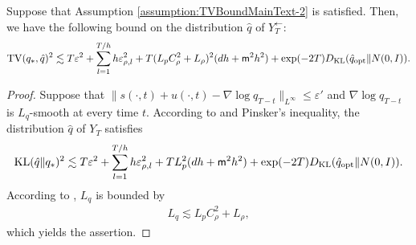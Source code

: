 \begin{thm}\label{thm:Diffusion-1-appendix}
Suppose that Assumption \ref{assumption:TVBoundMainText-2} is satisfied. Then, we have the following bound on the distribution $\hat{q}$ of $Y^\leftarrow_T$: 
\begin{align}
\mathrm{TV}(q_*,\hat{q})^2
\lesssim  T \varepsilon^2 + \sum_{l=1}^{T/h} h \varepsilon_{\rho,l}^2 + T (L_pC_\rho^2+L_\rho)^2(dh + \mathsf{m}^2 h^2 )+ \exp(-2 T)D_{\mathrm{KL}}(\hat{q}_{\mathrm{opt}} \| N(0,I)).
\end{align}
\end{thm}
\begin{proof}
    Suppose that $\|s(\cdot,t)+u(\cdot,t)-\nabla \log q_{T-t}\|_{L^\infty}\leq \varepsilon'$ and $\nabla \log q_{T-t}$ is $L_q$-smooth at every time $t$. 
    According to \cite{chen2023sampling} and Pinsker's inequality, the distribution $\hat{q}$ of $Y_T$ satisfies
    \begin{align}
        \mathrm{KL}(\hat{q}\|q_*)^2 \lesssim
       T \varepsilon^2 + \sum_{l=1}^{T/h} h \varepsilon_{\rho,l}^2 + T L_p^2(dh + \mathsf{m}^2 h^2 )+ \exp(-2 T)D_{\mathrm{KL}}(\hat{q}_{\mathrm{opt}} \| N(0,I)).
    \end{align}
    According to , $L_q$ is bounded by
    \begin{align}
        L_q \lesssim L_pC_\rho^2+L_\rho,
    \end{align}
    which yields the assertion.
\end{proof}


